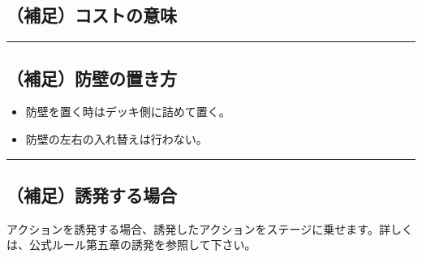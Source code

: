 \documentclass[twocolumn,a5paper,papersize,10pt]{jarticle}
\begin{document}
\subsection*{（補足）コストの意味}
\vspace{-1zh}%
\begin{small}
\end{small}

\vspace{-3zh}%
\hrule height 0.1mm depth 0mm width 66.5mm %
\vspace{-3zh}%

\subsection*{（補足）防壁の置き方}
\vspace{-1zh}%
\begin{itemize}
\setlength{\leftskip}{-0.3cm}%
\setlength{\parskip}{0pt}      %

\item 防壁を置く時はデッキ側に詰めて置く。
\item 防壁の左右の入れ替えは行わない。
\end{itemize}

\vspace{-1zh}%
\hrule height 0.1mm depth 0mm width 66.5mm %
\vspace{-3zh}%

\subsection*{（補足）誘発する場合}
\vspace{-1zh}%
アクションを誘発する場合、誘発したアクションをステージに乗せます。詳しくは、公式ルール第五章の誘発を参照して下さい。
\vspace{-1zh}%
\end{document}
